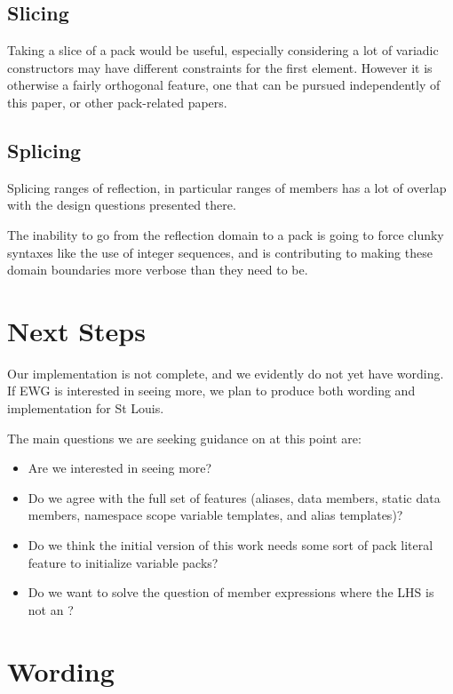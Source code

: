 \documentclass{wg21}
\begin{document}
\subsection{Slicing}

Taking a slice of a pack would be useful, especially considering a lot
of variadic constructors may have different constraints for the first element.
However it is otherwise a fairly orthogonal feature, one that can be pursued independently of this paper,
or other pack-related papers.

\subsection{Splicing}

Splicing ranges of reflection, in particular ranges of members has a lot of overlap with
the design questions presented there.

The inability to go from the reflection domain to a pack is going to force clunky syntaxes
like the use of integer sequences, and is contributing to making these domain boundaries more verbose than
they need to be.

\section{Next Steps}

Our implementation is not complete, and we evidently do not yet have wording.
If EWG is interested in seeing more, we plan to produce both wording and implementation for St Louis.

The main questions we are seeking guidance on at this point are:

\begin{itemize}
\item Are we interested in seeing more?
\item Do we agree with the full set of features (aliases, data members, static data members, namespace scope variable templates, and alias templates)?
\item Do we think the initial version of this work needs some sort of pack literal feature to initialize variable packs?
\item Do we want to solve the question of member expressions where the LHS is not an ?
\end{itemize}


\section{Wording}
\end{document}
